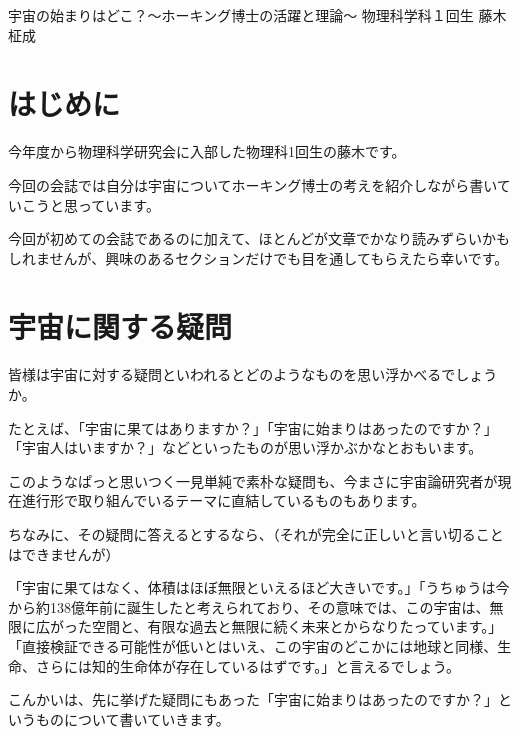 \documentclass[10pt,b5paper,papersize,dvipdfmx]{jsbook}
\begin{document}


\kaishititle%
  {宇宙の始まりはどこ？～ホーキング博士の活躍と理論～}%
  {物理科学科１回生}%
  {藤木 柾成}%

%
\section*{はじめに}
今年度から物理科学研究会に入部した物理科1回生の藤木です。\par
今回の会誌では自分は宇宙についてホーキング博士の考えを紹介しながら書いていこうと思っています。\par
今回が初めての会誌であるのに加えて、ほとんどが文章でかなり読みずらいかもしれませんが、興味のあるセクションだけでも目を通してもらえたら幸いです。\par




\newpage
%
\section{宇宙に関する疑問}
皆様は宇宙に対する疑問といわれるとどのようなものを思い浮かべるでしょうか。\par
たとえば、「宇宙に果てはありますか？」「宇宙に始まりはあったのですか？」「宇宙人はいますか？」などといったものが思い浮かぶかなとおもいます。\par
このようなぱっと思いつく一見単純で素朴な疑問も、今まさに宇宙論研究者が現在進行形で取り組んでいるテーマに直結しているものもあります。\par
ちなみに、その疑問に答えるとするなら、（それが完全に正しいと言い切ることはできませんが）\par
「宇宙に果てはなく、体積はほぼ無限といえるほど大きいです。」「うちゅうは今から約138億年前に誕生したと考えられており、その意味では、この宇宙は、無限に広がった空間と、有限な過去と無限に続く未来とからなりたっています。」「直接検証できる可能性が低いとはいえ、この宇宙のどこかには地球と同様、生命、さらには知的生命体が存在しているはずです。」と言えるでしょう。\par
こんかいは、先に挙げた疑問にもあった「宇宙に始まりはあったのですか？」というものについて書いていきます。\par



\newpage
\end{document}
